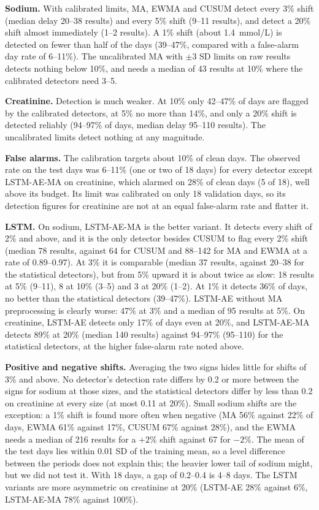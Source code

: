 \documentclass[conference]{IEEEtran}
\begin{document}
\textbf{Sodium.} With calibrated limits, MA, EWMA and CUSUM detect every 3\% shift (median delay 20--38 results) and every 5\% shift (9--11 results), and detect a 20\% shift almost immediately (1--2 results). A 1\% shift (about 1.4~mmol/L) is detected on fewer than half of the days (39--47\%, compared with a false-alarm day rate of 6--11\%). The uncalibrated MA with $\pm3$ SD limits on raw results detects nothing below 10\%, and needs a median of 43 results at 10\% where the calibrated detectors need 3--5.

\textbf{Creatinine.} Detection is much weaker. At 10\% only 42--47\% of days are flagged by the calibrated detectors, at 5\% no more than 14\%, and only a 20\% shift is detected reliably (94--97\% of days, median delay 95--110 results). The uncalibrated limits detect nothing at any magnitude.

\textbf{False alarms.} The calibration targets about 10\% of clean days. The observed rate on the test days was 6--11\% (one or two of 18 days) for every detector except LSTM-AE-MA on creatinine, which alarmed on 28\% of clean days (5 of 18), well above its budget. Its limit was calibrated on only 18 validation days, so its detection figures for creatinine are not at an equal false-alarm rate and flatter it.

\textbf{LSTM.} On sodium, LSTM-AE-MA is the better variant. It detects every shift of 2\% and above, and it is the only detector besides CUSUM to flag every 2\% shift (median 78 results, against 64 for CUSUM and 88--142 for MA and EWMA at a rate of 0.89--0.97). At 3\% it is comparable (median 37 results, against 20--38 for the statistical detectors), but from 5\% upward it is about twice as slow: 18 results at 5\% (9--11), 8 at 10\% (3--5) and 3 at 20\% (1--2). At 1\% it detects 36\% of days, no better than the statistical detectors (39--47\%). LSTM-AE without MA preprocessing is clearly worse: 47\% at 3\% and a median of 95 results at 5\%. On creatinine, LSTM-AE detects only 17\% of days even at 20\%, and LSTM-AE-MA detects 89\% at 20\% (median 140 results) against 94--97\% (95--110) for the statistical detectors, at the higher false-alarm rate noted above.

\textbf{Positive and negative shifts.} Averaging the two signs hides little for shifts of 3\% and above. No detector's detection rate differs by 0.2 or more between the signs for sodium at those sizes, and the statistical detectors differ by less than 0.2 on creatinine at every size (at most 0.11 at 20\%). Small sodium shifts are the exception: a 1\% shift is found more often when negative (MA 56\% against 22\% of days, EWMA 61\% against 17\%, CUSUM 67\% against 28\%), and the EWMA needs a median of 216 results for a $+2\%$ shift against 67 for $-2\%$. The mean of the test days lies within 0.01 SD of the training mean, so a level difference between the periods does not explain this; the heavier lower tail of sodium might, but we did not test it. With 18 days, a gap of 0.2--0.4 is 4--8 days. The LSTM variants are more asymmetric on creatinine at 20\% (LSTM-AE 28\% against 6\%, LSTM-AE-MA 78\% against 100\%).
\end{document}

